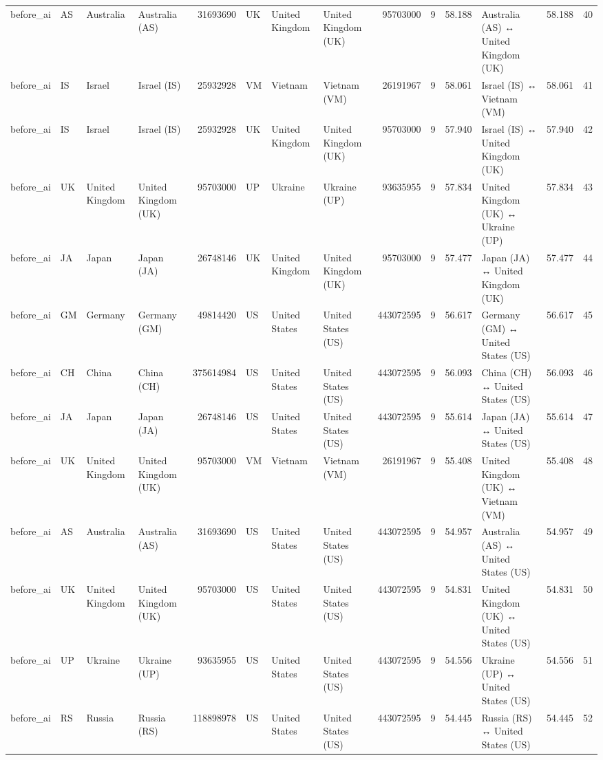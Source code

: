 \begin{tabular}{llllrlllrrrlrr}
before\_ai & AS & Australia & Australia (AS) & 31693690 & UK & United Kingdom & United Kingdom (UK) & 95703000 & 9 & 58.188 & Australia (AS) ↔ United Kingdom (UK) & 58.188 & 40 \\
before\_ai & IS & Israel & Israel (IS) & 25932928 & VM & Vietnam & Vietnam (VM) & 26191967 & 9 & 58.061 & Israel (IS) ↔ Vietnam (VM) & 58.061 & 41 \\
before\_ai & IS & Israel & Israel (IS) & 25932928 & UK & United Kingdom & United Kingdom (UK) & 95703000 & 9 & 57.940 & Israel (IS) ↔ United Kingdom (UK) & 57.940 & 42 \\
before\_ai & UK & United Kingdom & United Kingdom (UK) & 95703000 & UP & Ukraine & Ukraine (UP) & 93635955 & 9 & 57.834 & United Kingdom (UK) ↔ Ukraine (UP) & 57.834 & 43 \\
before\_ai & JA & Japan & Japan (JA) & 26748146 & UK & United Kingdom & United Kingdom (UK) & 95703000 & 9 & 57.477 & Japan (JA) ↔ United Kingdom (UK) & 57.477 & 44 \\
before\_ai & GM & Germany & Germany (GM) & 49814420 & US & United States & United States (US) & 443072595 & 9 & 56.617 & Germany (GM) ↔ United States (US) & 56.617 & 45 \\
before\_ai & CH & China & China (CH) & 375614984 & US & United States & United States (US) & 443072595 & 9 & 56.093 & China (CH) ↔ United States (US) & 56.093 & 46 \\
before\_ai & JA & Japan & Japan (JA) & 26748146 & US & United States & United States (US) & 443072595 & 9 & 55.614 & Japan (JA) ↔ United States (US) & 55.614 & 47 \\
before\_ai & UK & United Kingdom & United Kingdom (UK) & 95703000 & VM & Vietnam & Vietnam (VM) & 26191967 & 9 & 55.408 & United Kingdom (UK) ↔ Vietnam (VM) & 55.408 & 48 \\
before\_ai & AS & Australia & Australia (AS) & 31693690 & US & United States & United States (US) & 443072595 & 9 & 54.957 & Australia (AS) ↔ United States (US) & 54.957 & 49 \\
before\_ai & UK & United Kingdom & United Kingdom (UK) & 95703000 & US & United States & United States (US) & 443072595 & 9 & 54.831 & United Kingdom (UK) ↔ United States (US) & 54.831 & 50 \\
before\_ai & UP & Ukraine & Ukraine (UP) & 93635955 & US & United States & United States (US) & 443072595 & 9 & 54.556 & Ukraine (UP) ↔ United States (US) & 54.556 & 51 \\
before\_ai & RS & Russia & Russia (RS) & 118898978 & US & United States & United States (US) & 443072595 & 9 & 54.445 & Russia (RS) ↔ United States (US) & 54.445 & 52 \\

\end{tabular}
